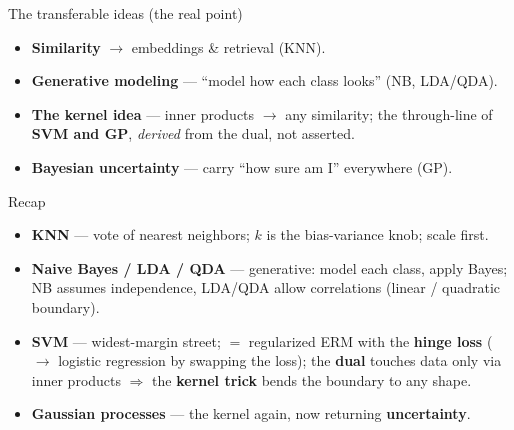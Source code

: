 \documentclass[aspectratio=169]{beamer}
\begin{document}
\begin{frame}{The transferable ideas (the real point)}
  \begin{itemize}\small
    \item \textbf{Similarity} $\to$ embeddings \& retrieval (KNN).
    \item \textbf{Generative modeling} --- ``model how each class looks'' (NB, LDA/QDA).
    \item \textbf{The kernel idea} --- inner products $\to$ any similarity; the through-line of
      \textbf{SVM and GP}, \emph{derived} from the dual, not asserted.
    \item \textbf{Bayesian uncertainty} --- carry ``how sure am I'' everywhere (GP).
  \end{itemize}
  \vfill
\end{frame}

\begin{frame}{Recap}
  \begin{itemize}\small
    \item \textbf{KNN} --- vote of nearest neighbors; $k$ is the bias-variance knob; scale first.
    \item \textbf{Naive Bayes / LDA / QDA} --- generative: model each class, apply Bayes; NB
      assumes independence, LDA/QDA allow correlations (linear / quadratic boundary).
    \item \textbf{SVM} --- widest-margin street; $=$ regularized ERM with the \textbf{hinge loss}
      ($\to$ logistic regression by swapping the loss); the \textbf{dual} touches data only via
      inner products $\Rightarrow$ the \textbf{kernel trick} bends the boundary to any shape.
    \item \textbf{Gaussian processes} --- the kernel again, now returning \textbf{uncertainty}.
  \end{itemize}
  \vfill
\end{frame}
\end{document}
